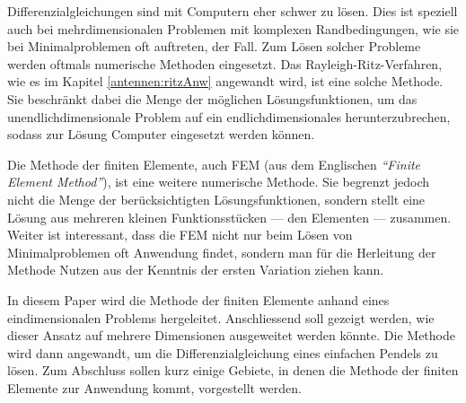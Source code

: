 %
%
%
%



Differenzialgleichungen sind mit Computern eher schwer zu lösen. 
Dies ist speziell auch bei mehrdimensionalen Problemen mit komplexen Randbedingungen, wie sie bei Minimalproblemen oft auftreten, der Fall. 
Zum Lösen solcher Probleme werden oftmals numerische Methoden eingesetzt. 
Das Rayleigh-Ritz-Verfahren, wie es im Kapitel \ref{antennen:ritzAnw} angewandt wird, ist eine solche Methode.
Sie beschränkt dabei die Menge der möglichen Lösungsfunktionen, um das unendlichdimensionale Problem auf ein endlichdimensionales herunterzubrechen, sodass zur Lösung Computer eingesetzt werden können. 

Die Methode der finiten Elemente, auch FEM (aus dem Englischen {\em ``Finite Element Method''}), ist eine weitere numerische Methode.
Sie begrenzt jedoch nicht die Menge der berücksichtigten Lösungsfunktionen, sondern stellt eine Lösung aus mehreren kleinen Funktionsstücken --- den Elementen --- zusammen.
Weiter ist interessant, dass die FEM nicht nur beim Lösen von Minimalproblemen oft Anwendung findet, sondern man für die Herleitung der Methode Nutzen aus der Kenntnis der ersten Variation ziehen kann. 

In diesem Paper wird die Methode der finiten Elemente anhand eines eindimensionalen Problems hergeleitet. 
Anschliessend soll gezeigt werden, wie dieser Ansatz auf mehrere Dimensionen ausgeweitet werden könnte. 
Die Methode wird dann angewandt, um die Differenzialgleichung eines einfachen Pendels zu lösen. 
Zum Abschluss sollen kurz einige Gebiete, in denen die Methode der finiten Elemente zur Anwendung kommt, vorgestellt werden.
